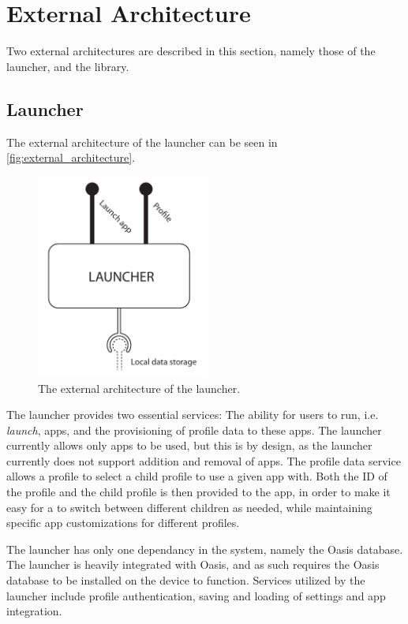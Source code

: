 \section{External Architecture}
Two external architectures are described in this section, namely those of the \giraf[] launcher, and the \guicomponents[] library.

\subsection{\giraf[] Launcher}
\label{sec:launcher_architecture}
The external architecture of the launcher can be seen in \autoref{fig:external_architecture}.
\begin{figure}[h]
	\centering
	\includegraphics[width=0.5\textwidth]{gfx/external_launcher_architecture.pdf}
	\caption{The external architecture of the \giraf[] launcher.}
	\label{fig:external_architecture}
\end{figure}
The launcher provides two essential services: The ability for users to run, i.e. \textit{launch}, apps, and the provisioning of profile data to these apps. 
The launcher currently allows only \giraf[] apps to be used, but this is by design, as the launcher currently does not support addition and removal of apps. 
The profile data service allows a \guardian[] profile to select a child profile to use a given app with. 
Both the ID of the \guardian[] profile and the child profile is then provided to the app, in order to make it easy for a \guardian[] to switch between different children as needed, while maintaining specific app customizations for different profiles. \newline

The \giraf[] launcher has only one dependancy in the \giraf[] system, namely the Oasis database. 
The launcher is heavily integrated with Oasis, and as such requires the Oasis database to be installed on the device to function. 
Services utilized by the launcher include profile authentication, saving and loading of settings and app integration. 

